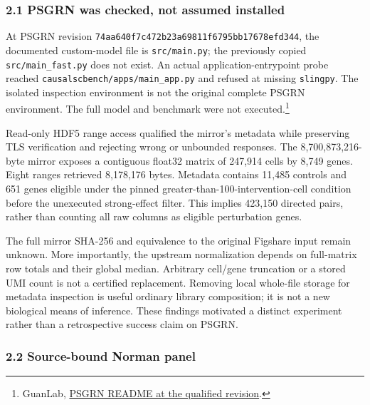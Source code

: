 \documentclass[
  10pt,
]{article}
\begin{document}
\hypertarget{psgrn-was-checked-not-assumed-installed}{%
\subsubsection{2.1 PSGRN was checked, not assumed
installed}\label{psgrn-was-checked-not-assumed-installed}}

At PSGRN revision \nolinkurl{74aa640f7c472b23a69811f6795bb17678efd344}, the
documented custom-model file is \texttt{src/main.py}; the previously
copied \texttt{src/main\_fast.py} does not exist. An actual
application-entrypoint probe reached
\texttt{causalscbench/apps/main\_app.py} and refused at missing
\texttt{slingpy}. The isolated inspection environment is not the
original complete PSGRN environment. The full model and benchmark were
not executed.\footnote{GuanLab,
  \href{https://github.com/GuanLab/PSGRN/blob/74aa640f7c472b23a69811f6795bb17678efd344/README.md}{PSGRN
  README at the qualified revision}.}

Read-only HDF5 range access qualified the mirror's metadata while
preserving TLS verification and rejecting wrong or unbounded responses.
The 8,700,873,216-byte mirror exposes a contiguous float32 matrix of
247,914 cells by 8,749 genes. Eight ranges retrieved 8,178,176 bytes.
Metadata contains 11,485 controls and 651 genes eligible under the
pinned greater-than-100-intervention-cell condition before the
unexecuted strong-effect filter. This implies 423,150 directed pairs,
rather than counting all raw columns as eligible perturbation genes.

The full mirror SHA-256 and equivalence to the original Figshare input
remain unknown. More importantly, the upstream normalization depends on
full-matrix row totals and their global median. Arbitrary cell/gene
truncation or a stored UMI count is not a certified replacement.
Removing local whole-file storage for metadata inspection is useful
ordinary library composition; it is not a new biological means of
inference. These findings motivated a distinct experiment rather than a
retrospective success claim on PSGRN.

\hypertarget{source-bound-norman-panel}{%
\subsubsection{2.2 Source-bound Norman
panel}\label{source-bound-norman-panel}}
\end{document}
